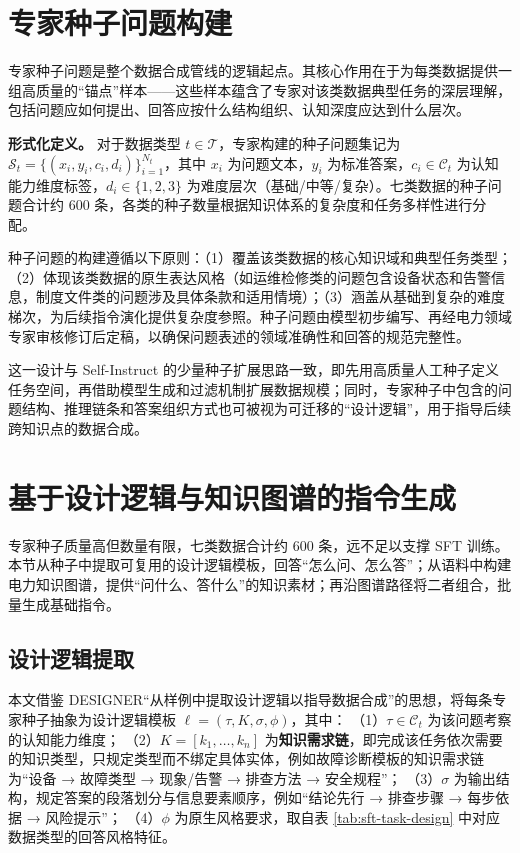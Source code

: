 \documentclass[fontset=fandol,type=master,campus=shenzhen,etitleauto=true]{hithesisbook}
\begin{document}
\section{专家种子问题构建}\label{ux4e13ux5bb6ux79cdux5b50ux95eeux9898ux6784ux5efa}

专家种子问题是整个数据合成管线的逻辑起点。其核心作用在于为每类数据提供一组高质量的``锚点''样本——这些样本蕴含了专家对该类数据典型任务的深层理解，包括问题应如何提出、回答应按什么结构组织、认知深度应达到什么层次。

\textbf{形式化定义。} 对于数据类型 $t \in \mathcal{T}$，专家构建的种子问题集记为 $\mathcal{S}_t = \{(x_i, y_i, c_i, d_i)\}_{i=1}^{N_t}$，其中 $x_i$ 为问题文本，$y_i$ 为标准答案，$c_i \in \mathcal{C}_t$ 为认知能力维度标签，$d_i \in \{1,2,3\}$ 为难度层次（基础/中等/复杂）。七类数据的种子问题合计约 600 条，各类的种子数量根据知识体系的复杂度和任务多样性进行分配。

种子问题的构建遵循以下原则：（1）覆盖该类数据的核心知识域和典型任务类型；（2）体现该类数据的原生表达风格（如运维检修类的问题包含设备状态和告警信息，制度文件类的问题涉及具体条款和适用情境）；（3）涵盖从基础到复杂的难度梯次，为后续指令演化提供复杂度参照。种子问题由模型初步编写、再经电力领域专家审核修订后定稿，以确保问题表述的领域准确性和回答的规范完整性。

这一设计与 Self-Instruct 的少量种子扩展思路一致，即先用高质量人工种子定义任务空间，再借助模型生成和过滤机制扩展数据规模\cite{ref24}；同时，专家种子中包含的问题结构、推理链条和答案组织方式也可被视为可迁移的“设计逻辑”，用于指导后续跨知识点的数据合成\cite{ref54}。

\section{基于设计逻辑与知识图谱的指令生成}\label{ux57faux4e8eux8bbeux8ba1ux903bux8f91ux63d0ux53d6ux4e0eux77e5ux8bc6ux56feux8c31ux7684ux4efbux52a1ux6570ux636eux751fux6210}

专家种子质量高但数量有限，七类数据合计约 600 条，远不足以支撑 SFT 训练。本节从种子中提取可复用的设计逻辑模板，回答“怎么问、怎么答”；从语料中构建电力知识图谱，提供“问什么、答什么”的知识素材；再沿图谱路径将二者组合，批量生成基础指令。

\subsection{设计逻辑提取}\label{ux4eceux4e13ux5bb6ux79cdux5b50ux4e2dux63d0ux53d6ux8bbeux8ba1ux903bux8f91}

本文借鉴 DESIGNER“从样例中提取设计逻辑以指导数据合成”的思想\cite{ref54}，将每条专家种子抽象为设计逻辑模板 $\ell = (\tau, K, \sigma, \phi)$，其中：
（1）$\tau \in \mathcal{C}_t$ 为该问题考察的认知能力维度；
（2）$K = [k_1, \ldots, k_n]$ 为\textbf{知识需求链}，即完成该任务依次需要的知识类型，只规定类型而不绑定具体实体，例如故障诊断模板的知识需求链为“设备 → 故障类型 → 现象/告警 → 排查方法 → 安全规程”；
（3）$\sigma$ 为输出结构，规定答案的段落划分与信息要素顺序，例如“结论先行 → 排查步骤 → 每步依据 → 风险提示”；
（4）$\phi$ 为原生风格要求，取自表 \ref{tab:sft-task-design} 中对应数据类型的回答风格特征。
\end{document}
